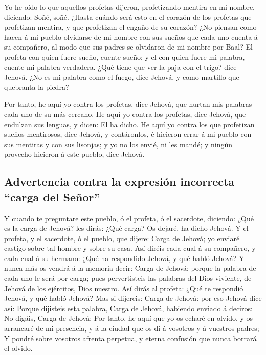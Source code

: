  Yo he oído lo que aquellos profetas dijeron,
profetizando mentira en mi nombre, diciendo: Soñé, soñé. 
¿Hasta cuándo será esto en el corazón de los profetas que profetizan
mentira, y que profetizan el engaño de su corazón?  ¿No
piensan como hacen á mi pueblo olvidarse de mi nombre con sus sueños que
cada uno cuenta á su compañero, al modo que sus padres se olvidaron de
mi nombre por Baal?  El profeta con quien fuere sueño,
cuente sueño; y el con quien fuere mi palabra, cuente mi palabra
verdadera. ¿Qué tiene que ver la paja con el trigo? dice Jehová.
 ¿No es mi palabra como el fuego, dice Jehová, y como
martillo que quebranta la piedra?

 Por tanto, he aquí yo contra los profetas, dice Jehová,
que hurtan mis palabras cada uno de su más cercano.  He
aquí yo contra los profetas, dice Jehová, que endulzan sus lenguas, y
dicen: El ha dicho.  He aquí yo contra los que profetizan
sueños mentirosos, dice Jehová, y contáronlos, é hicieron errar á mi
pueblo con sus mentiras y con sus lisonjas; y yo no los envié, ni les
mandé; y ningún provecho hicieron á este pueblo, dice Jehová.

\hypertarget{advertencia-contra-la-expresiuxf3n-incorrecta-carga-del-seuxf1or}{%
\subsection{Advertencia contra la expresión incorrecta ``carga del
Señor''}\label{advertencia-contra-la-expresiuxf3n-incorrecta-carga-del-seuxf1or}}

 Y cuando te preguntare este pueblo, ó el profeta, ó el
sacerdote, diciendo: ¿Qué es la carga de Jehová? les dirás: ¿Qué carga?
Os dejaré, ha dicho Jehová.  Y el profeta, y el
sacerdote, ó el pueblo, que dijere: Carga de Jehová; yo enviaré castigo
sobre tal hombre y sobre su casa.  Así diréis cada cual á
su compañero, y cada cual á su hermano: ¿Qué ha respondido Jehová, y qué
habló Jehová?  Y nunca más os vendrá á la memoria decir:
Carga de Jehová: porque la palabra de cada uno le será por carga; pues
pervertisteis las palabras del Dios viviente, de Jehová de los
ejércitos, Dios nuestro.  Así dirás al profeta: ¿Qué te
respondió Jehová, y qué habló Jehová?  Mas si dijereis:
Carga de Jehová: por eso Jehová dice así: Porque dijisteis esta palabra,
Carga de Jehová, habiendo enviado á deciros: No digáis, Carga de Jehová:
 Por tanto, he aquí que yo os echaré en olvido, y os
arrancaré de mi presencia, y á la ciudad que os dí á vosotros y á
vuestros padres;  Y pondré sobre vosotros afrenta
perpetua, y eterna confusión que nunca borrará el olvido.


